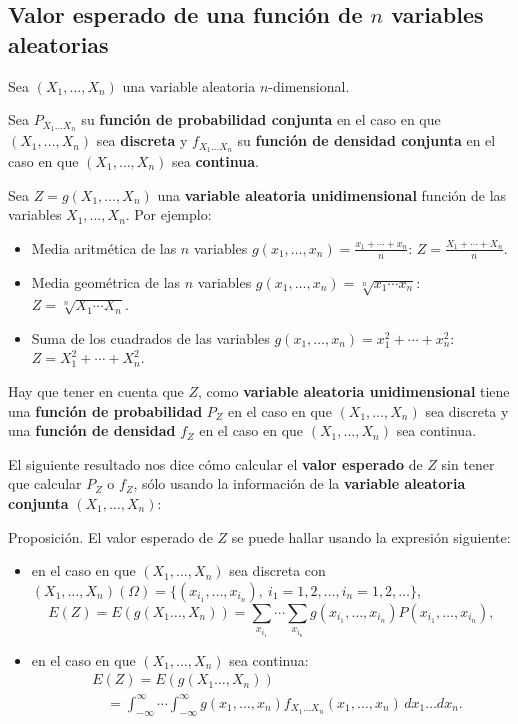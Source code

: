 \documentclass[]{book}
\providecommand{\tightlist}{%
  \setlength{\itemsep}{0pt}\setlength{\parskip}{0pt}}
\begin{document}
\hypertarget{valor-esperado-de-una-funciuxf3n-de-n-variables-aleatorias}{%
\subsection{\texorpdfstring{Valor esperado de una función de \(n\) variables aleatorias}{Valor esperado de una función de n variables aleatorias}}\label{valor-esperado-de-una-funciuxf3n-de-n-variables-aleatorias}}

Sea \((X_1,\ldots,X_n)\) una variable aleatoria \(n\)-dimensional.

Sea \(P_{X_1\ldots X_n}\) su \textbf{función de probabilidad conjunta} en el caso en que \((X_1,\ldots,X_n)\) sea \textbf{discreta} y \(f_{X_1\ldots X_n}\) su \textbf{función de densidad conjunta} en el caso en que \((X_1,\ldots,X_n)\) sea \textbf{continua}.

Sea \(Z=g(X_1,\ldots,X_n)\) una \textbf{variable aleatoria unidimensional} función de las variables \(X_1,\ldots,X_n\). Por ejemplo:

\begin{itemize}
\tightlist
\item
  Media aritmética de las \(n\) variables \(g(x_1,\ldots,x_n)=\frac{x_1+\cdots + x_n}{n}\): \(Z=\frac{X_1+\cdots +X_n}{n}\).
\item
  Media geométrica de las \(n\) variables \(g(x_1,\ldots,x_n)=\sqrt[n]{x_1\cdots x_n}\): \(Z=\sqrt[n]{X_1\cdots X_n}\).
\item
  Suma de los cuadrados de las variables \(g(x_1,\ldots,x_n)=x_1^2+\cdots +x_n^2\): \(Z=X_1^2+\cdots +X_n^2\).
\end{itemize}

Hay que tener en cuenta que \(Z\), como \textbf{variable aleatoria unidimensional} tiene una \textbf{función de probabilidad} \(P_Z\) en el caso en que \((X_1,\ldots,X_n)\) sea discreta y una \textbf{función de densidad} \(f_Z\) en el caso en que \((X_1,\ldots,X_n)\) sea continua.

El siguiente resultado nos dice cómo calcular el \textbf{valor esperado} de \(Z\) sin tener que calcular \(P_Z\) o \(f_Z\), sólo usando la información de la \textbf{variable aleatoria conjunta} \((X_1,\ldots,X_n)\):

Proposición.
El valor esperado de \(Z\) se puede hallar usando la expresión siguiente:

\begin{itemize}
\item
  en el caso en que \((X_1,\ldots,X_n)\) sea discreta con \((X_1,\ldots,X_n)(\Omega)=\{(x_{i_1},\ldots,x_{i_n}),\ i_1=1,2,\ldots, i_n=1,2,\ldots\}\),
  \[
  E(Z)  = E(g(X_1\ldots,X_n))  =\sum_{x_{i_1}}\cdots\sum_{x_{i_n}}g(x_{i_1},\ldots,x_{i_n})P(x_{i_1},\ldots,x_{i_n}),
  \]
\item
  en el caso en que \((X_1,\ldots,X_n)\) sea continua:
  \[
  \begin{array}{rl}
  & E(Z)=E(g(X_1\ldots,X_n)) \\ & \quad =\int_{-\infty}^\infty\cdots\int_{-\infty}^\infty g(x_1,\ldots,x_n)f_{X_1\ldots X_n}(x_1,\ldots,x_n)\, dx_1\ldots dx_n.
  \end{array}
  \]
\end{itemize}
\end{document}
